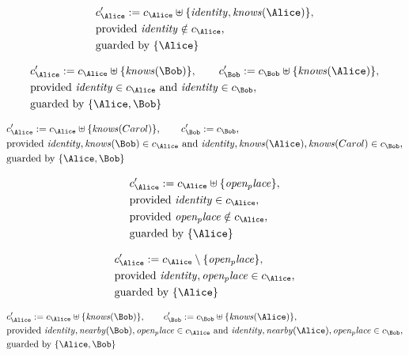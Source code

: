 \begin{align*}
&
c'_
{
\Alice
}
 := 
c_
{
\Alice
}
 \uplus 
\{
\mathit{
identity
}
,
\mathit{
knows
}
(
\Alice
)
\}
,\\
&
\text{provided } 
\mathit{
identity
}
 \notin c_
{
\Alice
}
,\\
&
\text{guarded by } \{
\Alice
\}
\end{align*}

\begin{align*}
&
c'_
{
\Alice
}
 := 
c_
{
\Alice
}
 \uplus 
\{
\mathit{
knows
}
(
\Bob
)
\}
, \qquad 
c'_
{
\Bob
}
 := 
c_
{
\Bob
}
 \uplus 
\{
\mathit{
knows
}
(
\Alice
)
\}
,\\
&
\text{provided } 
\mathit{
identity
}
 \in c_
{
\Alice
}
 \text{ and } 
\mathit{
identity
}
 \in c_
{
\Bob
}
,\\
&
\text{guarded by } \{
\Alice
,
\Bob
\}
\end{align*}

\begin{align*}
&
c'_
{
\Alice
}
 := 
c_
{
\Alice
}
 \uplus 
\{
\mathit{
knows
}
(
Carol
)
\}
, \qquad 
c'_
{
\Bob
}
 := 
c_
{
\Bob
}
,\\
&
\text{provided } 
\mathit{
identity
}
,
\mathit{
knows
}
(
\Bob
)
 \in c_
{
\Alice
}
 \text{ and } 
\mathit{
identity
}
,
\mathit{
knows
}
(
\Alice
)
,
\mathit{
knows
}
(
Carol
)
 \in c_
{
\Bob
}
,\\
&
\text{guarded by } \{
\Alice
,
\Bob
\}
\end{align*}

\begin{align*}
&
c'_
{
\Alice
}
 := 
c_
{
\Alice
}
 \uplus 
\{
\mathit{
open_place
}
\}
,\\
&
\text{provided } 
\mathit{
identity
}
 \in c_
{
\Alice
}
,\\
&
\text{provided } 
\mathit{
open_place
}
 \notin c_
{
\Alice
}
,\\
&
\text{guarded by } \{
\Alice
\}
\end{align*}

\begin{align*}
&
c'_
{
\Alice
}
 := 
c_
{
\Alice
}
 \setminus 
\{
\mathit{
open_place
}
\}
,\\
&
\text{provided } 
\mathit{
identity
}
,
\mathit{
open_place
}
 \in c_
{
\Alice
}
,\\
&
\text{guarded by } \{
\Alice
\}
\end{align*}

\begin{align*}
&
c'_
{
\Alice
}
 := 
c_
{
\Alice
}
 \uplus 
\{
\mathit{
knows
}
(
\Bob
)
\}
, \qquad 
c'_
{
\Bob
}
 := 
c_
{
\Bob
}
 \uplus 
\{
\mathit{
knows
}
(
\Alice
)
\}
,\\
&
\text{provided } 
\mathit{
identity
}
,
\mathit{
nearby
}
(
\Bob
)
,
\mathit{
open_place
}
 \in c_
{
\Alice
}
 \text{ and } 
\mathit{
identity
}
,
\mathit{
nearby
}
(
\Alice
)
,
\mathit{
open_place
}
 \in c_
{
\Bob
}
,\\
&
\text{guarded by } \{
\Alice
,
\Bob
\}
\end{align*}
